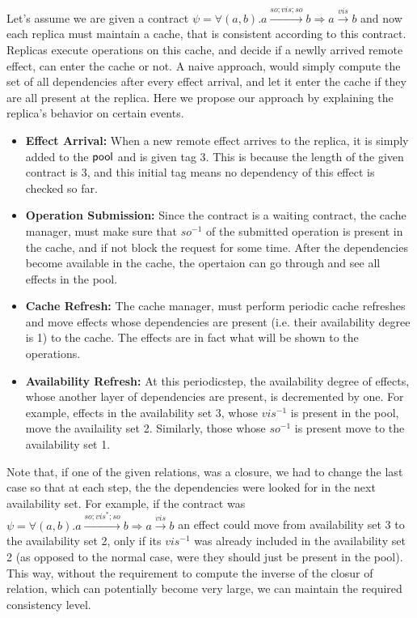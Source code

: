 Let's assume we are given a contract $\psi=\forall (a,b). a
\xrightarrow{so;vis;so}b \Rightarrow a \xrightarrow{vis} b$ and now each
replica must maintain a cache, that is consistent according to this
contract. Replicas execute operations on this cache, and decide if a
newlly arrived remote effect, can enter the cache or not. 
A naive approach, would simply compute the set of all
dependencies after every effect arrival, and let it enter the cache if
they are all present at the replica. Here we propose our approach by
explaining the replica's behavior on certain events. 
\begin{itemize}
\item {\bf Effect Arrival:} When a new remote effect arrives to the
replica, it is simply added to the ${\normalfont \textsf{pool}}$ and is given tag 3. This is
because the length of the given contract is 3, and this initial tag
means no dependency of this effect is checked so far.
\item {\bf Operation Submission: } Since the contract is a waiting
contract, the cache manager, must make sure that $so^{-1}$ of the
submitted operation is present in the cache, and if not block the
request for some time. After the dependencies become available in
the cache, the opertaion can go through and see all effects in the pool.
\item {\bf Cache Refresh: } The cache manager, must perform periodic
cache refreshes and move effects whose dependencies are present (i.e.
their availability degree is 1) to the cache. The effects are in fact
what will be shown to the operations.
\item {\bf Availability Refresh: } At this periodicstep, the
availability degree of effects, whose another layer of dependencies are
present, is decremented by one. For example, effects in the availability
set 3, whose $vis^{-1}$ is present in the pool, move the availaility set
2. Similarly, those whose $so^{-1}$ is present move to the availability
set 1.
\end{itemize}

Note that, if one of the given relations, was a closure, we had to
change the last case so that at each step, the the dependencies were
looked for in the next availability set. For example, if the contract
was $\psi=\forall (a,b). a
\xrightarrow{so;vis^*;so}b \Rightarrow a \xrightarrow{vis} b$
an effect could move from availability set 3 to the availability set 2,
only if its $vis^{-1}$ was already included in the availability set 2
(as opposed to the normal case, were they should just be present in the
pool). This way, without the requirement to compute the inverse of the closur of
relation, which can potentially become very large, we can maintain the
required consistency level.










\newpage 
